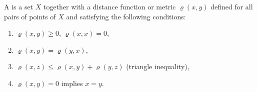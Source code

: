 A  is a set $X$ together with a distance function or metric $\varrho(x, y)$ defined for all pairs of points of $X$ and satisfying the following conditions:
\begin{enumerate}
\item $\varrho(x, y) \geq 0$, $\varrho(x, x) = 0$,
\item $\varrho(x, y) = \varrho(y, x)$,
\item $\varrho(x, z) \leq \varrho(x, y) + \varrho(y, z)$ (triangle inequality),
\item $\varrho(x, y) = 0$ implies $x = y$.
\end{enumerate}
